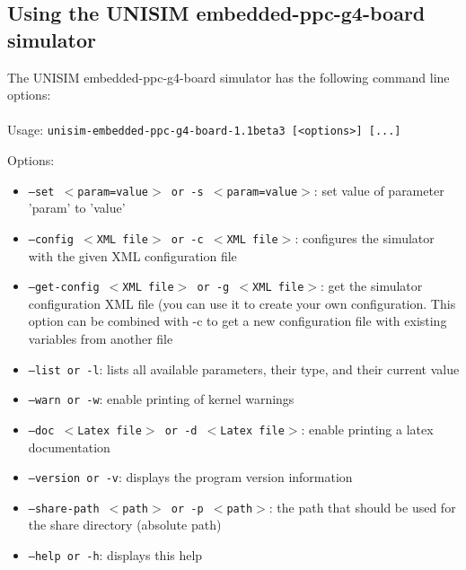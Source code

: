 \subsection{Using the UNISIM embedded-ppc-g4-board simulator}
\label{UNISIM embedded-ppc-g4-board_using}
The UNISIM embedded-ppc-g4-board simulator has the following command line options:\\
~\\
\noindent Usage: \texttt{unisim-embedded-ppc-g4-board-1.1beta3 [<options>] [...]}

\noindent Options:
\begin{itemize}
\item \texttt{--set $<$param=value$>$ or -s $<$param=value$>$}: set value of parameter 'param' to 'value'
\item \texttt{--config $<$XML file$>$ or -c $<$XML file$>$}: configures the simulator with the given XML configuration file
\item \texttt{--get-config $<$XML file$>$ or -g $<$XML file$>$}: get the simulator configuration XML file (you can use it to create your own configuration. This option can be combined with -c to get a new configuration file with existing variables from another file
\item \texttt{--list or -l}: lists all available parameters, their type, and their current value
\item \texttt{--warn or -w}: enable printing of kernel warnings
\item \texttt{--doc $<$Latex file$>$ or -d $<$Latex file$>$}: enable printing a latex documentation
\item \texttt{--version or -v}: displays the program version information
\item \texttt{--share-path $<$path$>$ or -p $<$path$>$}: the path that should be used for the share directory (absolute path)
\item \texttt{--help or -h}: displays this help
\end{itemize}
